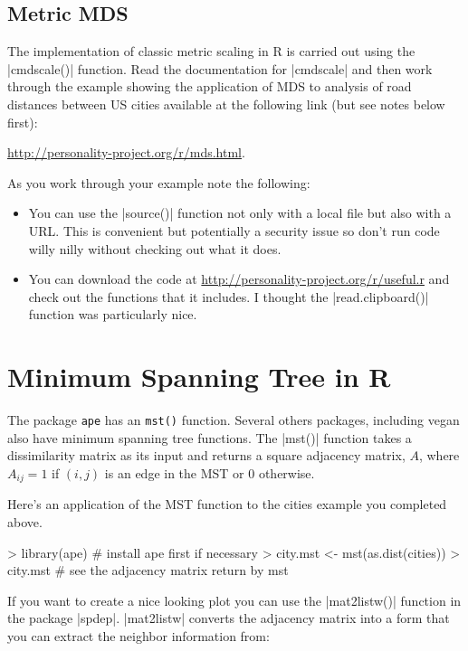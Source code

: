 \subsection{Metric MDS}

The implementation of classic metric scaling in R is carried out using the |cmdscale()| function. Read the documentation for |cmdscale| and then work through the example showing the application of MDS to analysis of road distances between US cities available at the following link (but see notes below first):

\href{http://personality-project.org/r/mds.html}{http://personality-project.org/r/mds.html}.

\medskip
As you work through your example note the following:

\begin{itemize}
\item You can use the |source()| function not only with a local file but also with a URL.  This is convenient but potentially a security issue so don't run code willy nilly without checking out what it does.

\item You can download the code at \href{http://personality-project.org/r/useful.r}{http://personality-project.org/r/useful.r} and check out the functions that it includes. I thought the |read.clipboard()| function was particularly nice.
\end{itemize}


\section{Minimum Spanning Tree in R}

The package \texttt{ape} has an \texttt{mst()} function. Several others packages, including vegan also have minimum spanning tree functions. The |mst()| function takes a dissimilarity matrix as its input and returns a square adjacency matrix, $A$, where $A_{ij} = 1$ if $(i,j)$ is an edge in the MST or 0 otherwise.

Here's an application of the MST function to the cities example you completed above.

\begin{R}
> library(ape) # install ape first if necessary
> city.mst <- mst(as.dist(cities))
> city.mst # see the adjacency matrix return by mst
\end{R}

If you want to create a nice looking plot you can use the  |mat2listw()| function in the package |spdep|. |mat2listw|  converts the adjacency matrix into a form that you can extract the neighbor information from:

